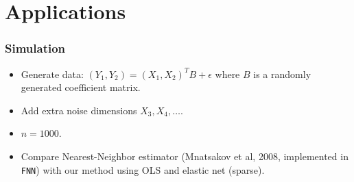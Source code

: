 \documentclass{beamer}
\newcommand{\bX}{\boldsymbol{X}}
\newcommand{\bY}{\boldsymbol{Y}}
\begin{document}




\section{Applications}

\begin{frame}
\sectionpage
\end{frame}

\begin{frame}
\frametitle{Simulation}

\begin{itemize}
\item Generate data: $(Y_1, Y_2) = (X_1, X_2)^T B + \epsilon$ where $B$ is a randomly generated coefficient matrix.
\item Add extra noise dimensions $X_3, X_4, \hdots$.
\item $n = 1000$.
\item Compare Nearest-Neighbor estimator (Mnatsakov et al, 2008, implemented in {\tt FNN}) with our method using OLS and elastic net (sparse).
\end{itemize}

\end{frame}
\end{document}
